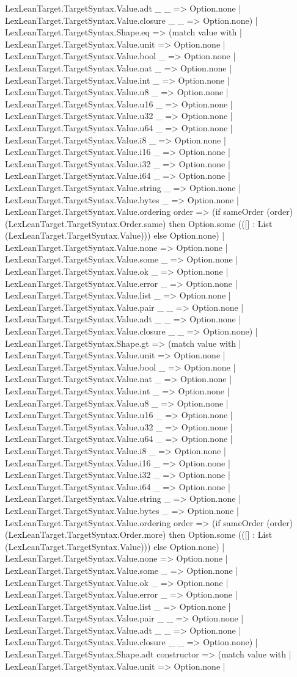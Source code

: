 \documentclass[11pt]{article}
\begin{document}
LexLeanTarget.TargetSyntax.Value.adt \_ \_ => Option.none | LexLeanTarget.TargetSyntax.Value.closure \_ \_ => Option.none) | LexLeanTarget.TargetSyntax.Shape.eq => (match value with | LexLeanTarget.TargetSyntax.Value.unit => Option.none | LexLeanTarget.TargetSyntax.Value.bool \_ => Option.none | LexLeanTarget.TargetSyntax.Value.nat \_ => Option.none | LexLeanTarget.TargetSyntax.Value.int \_ => Option.none | LexLeanTarget.TargetSyntax.Value.u8 \_ => Option.none | LexLeanTarget.TargetSyntax.Value.u16 \_ => Option.none | LexLeanTarget.TargetSyntax.Value.u32 \_ => Option.none | LexLeanTarget.TargetSyntax.Value.u64 \_ => Option.none | LexLeanTarget.TargetSyntax.Value.i8 \_ => Option.none | LexLeanTarget.TargetSyntax.Value.i16 \_ => Option.none | LexLeanTarget.TargetSyntax.Value.i32 \_ => Option.none | LexLeanTarget.TargetSyntax.Value.i64 \_ => Option.none | LexLeanTarget.TargetSyntax.Value.string \_ => Option.none | LexLeanTarget.TargetSyntax.Value.bytes \_ => Option.none | LexLeanTarget.TargetSyntax.Value.ordering order => (if sameOrder (order) (LexLeanTarget.TargetSyntax.Order.same) then Option.some (([] : List (LexLeanTarget.TargetSyntax.Value))) else Option.none) | LexLeanTarget.TargetSyntax.Value.none => Option.none | LexLeanTarget.TargetSyntax.Value.some \_ => Option.none | LexLeanTarget.TargetSyntax.Value.ok \_ => Option.none | LexLeanTarget.TargetSyntax.Value.error \_ => Option.none | LexLeanTarget.TargetSyntax.Value.list \_ => Option.none | LexLeanTarget.TargetSyntax.Value.pair \_ \_ => Option.none | LexLeanTarget.TargetSyntax.Value.adt \_ \_ => Option.none | LexLeanTarget.TargetSyntax.Value.closure \_ \_ => Option.none) | LexLeanTarget.TargetSyntax.Shape.gt => (match value with | LexLeanTarget.TargetSyntax.Value.unit => Option.none | LexLeanTarget.TargetSyntax.Value.bool \_ => Option.none | LexLeanTarget.TargetSyntax.Value.nat \_ => Option.none | LexLeanTarget.TargetSyntax.Value.int \_ => Option.none | LexLeanTarget.TargetSyntax.Value.u8 \_ => Option.none | LexLeanTarget.TargetSyntax.Value.u16 \_ => Option.none | LexLeanTarget.TargetSyntax.Value.u32 \_ => Option.none | LexLeanTarget.TargetSyntax.Value.u64 \_ => Option.none | LexLeanTarget.TargetSyntax.Value.i8 \_ => Option.none | LexLeanTarget.TargetSyntax.Value.i16 \_ => Option.none | LexLeanTarget.TargetSyntax.Value.i32 \_ => Option.none | LexLeanTarget.TargetSyntax.Value.i64 \_ => Option.none | LexLeanTarget.TargetSyntax.Value.string \_ => Option.none | LexLeanTarget.TargetSyntax.Value.bytes \_ => Option.none | LexLeanTarget.TargetSyntax.Value.ordering order => (if sameOrder (order) (LexLeanTarget.TargetSyntax.Order.more) then Option.some (([] : List (LexLeanTarget.TargetSyntax.Value))) else Option.none) | LexLeanTarget.TargetSyntax.Value.none => Option.none | LexLeanTarget.TargetSyntax.Value.some \_ => Option.none | LexLeanTarget.TargetSyntax.Value.ok \_ => Option.none | LexLeanTarget.TargetSyntax.Value.error \_ => Option.none | LexLeanTarget.TargetSyntax.Value.list \_ => Option.none | LexLeanTarget.TargetSyntax.Value.pair \_ \_ => Option.none | LexLeanTarget.TargetSyntax.Value.adt \_ \_ => Option.none | LexLeanTarget.TargetSyntax.Value.closure \_ \_ => Option.none) | LexLeanTarget.TargetSyntax.Shape.adt constructor => (match value with | LexLeanTarget.TargetSyntax.Value.unit => Option.none | 
\end{document}

